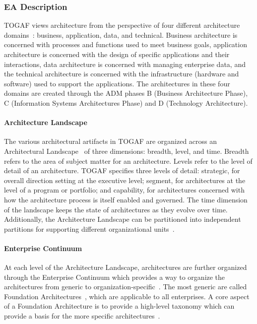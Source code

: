 
\subsubsection{EA Description}
TOGAF views architecture from the perspective of four different architecture domains~\cite{sessions2007}: business, application, data, and technical. Business architecture is concerned with processes and functions used to meet business goals, application architecture is concerned with the design of specific applications and their interactions, data architecture is concerned with managing enterprise data, and the technical architecture is concerned with the infrastructure (hardware and software) used to support the applications. The architectures in these four domains are created through the ADM phases B (Business Architecture Phase), C (Information Systems Architectures Phase) and D (Technology Architecture).

\paragraph*{Architecture Landscape}
The various architectural artifacts in TOGAF are organized across an Architectural Landscape~\cite[Ch. 20]{togaf9.1} of three dimensions: breadth, level, and time. Breadth refers to the area of subject matter for an architecture. Levels refer to the level of detail of an architecture. TOGAF specifies three levels of detail: strategic, for overall direction setting at the executive level; segment, for architectures at the level of a program or portfolio; and capability, for architectures concerned with how the architecture process is itself enabled and governed. The time dimension of the landscape keeps the state of architectures as they evolve over time. Additionally, the Architecture Landscape can be partitioned into independent partitions for supporting different organizational units~\cite[Ch. 40]{togaf9.1}. 



\paragraph*{Enterprise Continuum}
At each level of the Architecture Landscape, architectures are further organized through the Enterprise Continuum which provides a way to organize the architectures from generic to organization-specific~\cite[Ch. 39]{togaf9.1}. The most generic are called Foundation Architectures~\cite[Ch. 39.4.1]{togaf9.1}, which are applicable to all enterprises. A core aspect of a Foundation Architecture is to provide a high-level taxonomy which can provide a basis for the more specific architectures~\cite[Ch. 43]{togaf9.1}. 

